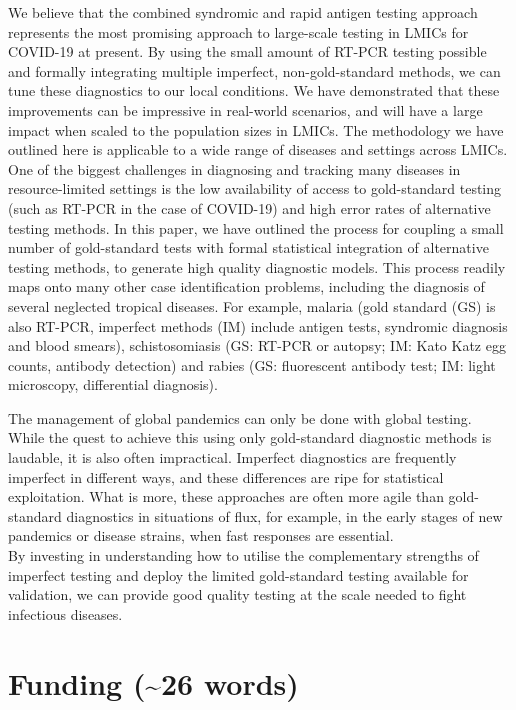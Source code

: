 \documentclass[]{elsarticle} %
\begin{document}
We believe that the combined syndromic and rapid antigen testing approach represents the most promising approach to large-scale testing in LMICs for COVID-19 at present.
By using the small amount of RT-PCR testing possible and formally integrating multiple imperfect, non-gold-standard methods, we can tune these diagnostics to our local conditions.
We have demonstrated that these improvements can be impressive in real-world scenarios, and will have a large impact when scaled to the population sizes in LMICs.
The methodology we have outlined here is applicable to a wide range of diseases and settings across LMICs.
One of the biggest challenges in diagnosing and tracking many diseases in resource-limited settings is the low availability of access to gold-standard testing (such as RT-PCR in the case of COVID-19) and high error rates of alternative testing methods.
In this paper, we have outlined the process for coupling a small number of gold-standard tests with formal statistical integration of alternative testing methods, to generate high quality diagnostic models.
This process readily maps onto many other case identification problems, including the diagnosis of several neglected tropical diseases. For example, malaria (gold standard (GS) is also RT-PCR, imperfect methods (IM) include antigen tests, syndromic diagnosis and blood smears), schistosomiasis (GS: RT-PCR or autopsy; IM: Kato Katz egg counts, antibody detection) and rabies (GS: fluorescent antibody test; IM: light microscopy, differential diagnosis).

The management of global pandemics can only be done with global testing.
While the quest to achieve this using only gold-standard diagnostic methods is laudable, it is also often impractical.
Imperfect diagnostics are frequently imperfect in different ways, and these differences are ripe for statistical exploitation.
What is more, these approaches are often more agile than gold-standard diagnostics in situations of flux, for example, in the early stages of new pandemics or disease strains, when fast responses are essential.\\
By investing in understanding how to utilise the complementary strengths of imperfect testing and deploy the limited gold-standard testing available for validation, we can provide good quality testing at the scale needed to fight infectious diseases.

\hypertarget{funding-26-words}{%
\section{Funding (\textasciitilde26 words)}\label{funding-26-words}}
\end{document}
